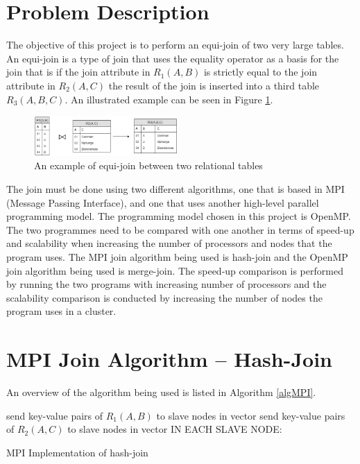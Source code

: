 \documentclass[journal,draftclsnofoot]{IEEEtran}
\begin{document}
\section{Problem Description}\label{prob}
The objective of this project is to perform an equi-join of two very large tables. An equi-join is a type of join that uses the equality operator as a basis for the join \cite{w3resource.com2018} that is if the join attribute in $R_{1}(A,B)$ is strictly equal to the join attribute in $R_{2}(A,C)$ the result of the join is inserted into a third table $R_{3}(A, B, C)$. An illustrated example can be seen in Figure \ref{fig:Equi-Join}.
\begin{figure}[htbp]
	\centering
		\includegraphics[width=0.4882\textwidth]{Equi-Join.png}
	\caption{An example of equi-join between two relational tables}
	\label{fig:Equi-Join}
\end{figure}
The join must be done using two different algorithms, one that is based in MPI (Message Passing Interface), and one that uses another high-level parallel programming model. The programming model chosen in this project is OpenMP. The two programmes need to be compared with one another in terms of speed-up and scalability when increasing the number of processors and nodes that the program uses. The MPI join algorithm being used is hash-join and the OpenMP join algorithm being used is merge-join. The speed-up comparison is performed by running the two programs with increasing number of processors and the scalability comparison is conducted by increasing the number of nodes the program uses in a cluster.

\section{MPI Join Algorithm -- Hash-Join}\label{mpi}
An overview of the algorithm being used is listed in Algorithm \ref{algMPI}.
\begin{algorithm}
send key-value pairs of $R_{1}(A,B)$ to slave nodes in vector\;
send key-value pairs of $R_{2}(A,C)$ to slave nodes in vector\;
IN EACH SLAVE NODE:\\

 \caption{MPI Implementation of hash-join}
\label{algMPI}
\end{algorithm}
\end{document}
